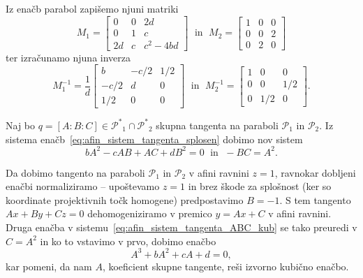 Iz enačb parabol zapišemo njuni matriki
$$ M_1 =
    \begin{bmatrix}
        0 & 0 & 2d\\
        0 & 1 & c\\
        2d & c & c^2-4bd
    \end{bmatrix}
    \; \text{ in } \; M_2 =
    \begin{bmatrix}
        1 & 0 & 0\\
        0 & 0 & 2\\
        0 & 2 & 0
    \end{bmatrix}
$$
ter izračunamo njuna inverza
$$ M^{-1}_1 = \frac{1}{d}
    \begin{bmatrix}
        b & -c/2 & 1/2\\
        -c/2 & d & 0\\
        1/2 & 0 & 0
    \end{bmatrix}
\; \text{ in } \; M^{-1}_2 =
    \begin{bmatrix}
        1 & 0 & 0\\
        0 & 0 & 1/2\\
        0 & 1/2 & 0
    \end{bmatrix}.
$$

Naj bo $q = [A : B : C] \in \mathcal{P^*}_1 \cap \mathcal{P^*}_2$ skupna tangenta na paraboli $\mathcal{P}_1$ in $\mathcal{P}_2$. Iz sistema enačb~\ref{eq:afin_sistem_tangenta_splosen} dobimo nov sistem
\begin{equation}
    \label{eq:afin_sistem_tangenta_ABC_kub}
    bA^2 - cAB + AC + dB^2 = 0 \; \text{ in } \; -BC = A^2.
\end{equation}

Da dobimo tangento na paraboli $\mathcal{P}_1$ in $\mathcal{P}_2$ v afini ravnini $z = 1$, ravnokar dobljeni enačbi normaliziramo -- upoštevamo $z = 1$ in brez škode za splošnost (ker so koordinate projektivnih točk homogene) predpostavimo $B = -1$. S tem tangento $Ax + By + Cz = 0$ dehomogeniziramo v premico $y = Ax + C$ v afini ravnini. Druga enačba v sistemu~\ref{eq:afin_sistem_tangenta_ABC_kub} se tako preuredi v $C = A^2$ in ko to vstavimo v prvo, dobimo enačbo
$$ A^3 + bA^2 + cA + d = 0,$$
kar pomeni, da nam $A$, koeficient skupne tangente, reši izvorno kubično enačbo.


